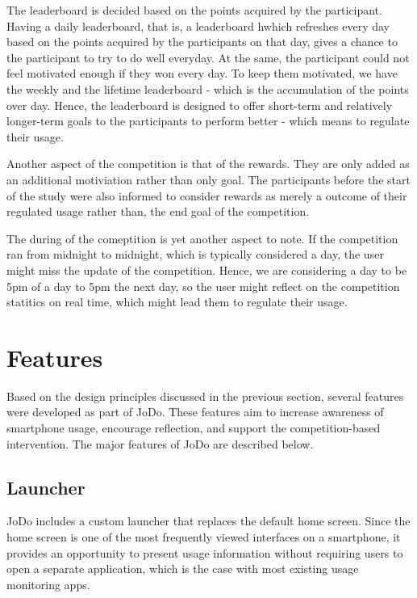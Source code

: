 \documentclass[11pt]{report}
\begin{document}
The leaderboard is decided based on the points acquired by the participant. Having a daily leaderboard, that is, a leaderboard hwhich refreshes every day based on the points acquired by the participants on that day, gives a chance to the participant to try to do well everyday. 
At the same, the participant could not feel motivated enough if they won every day. 
To keep them motivated, we have the weekly and the lifetime leaderboard - which is the accumulation of the points over day. Hence, the leaderboard is designed to offer short-term and relatively longer-term goals to the participants to perform better - which means to regulate their usage.

Another aspect of the competition is that of the rewards. They are only added as an additional motiviation rather than only goal. The participants before the start of the study were also informed to consider rewards as merely a outcome of their regulated usage rather than, the end goal of the competition.

The during of the comeptition is yet another aspect to note. 
If the competition ran from midnight to midnight, which is typically considered a day, 
the user might miss the update of the competition. Hence, we are considering a day to be 
5pm of a day to 5pm the next day, so the user might reflect on the competition statitics 
on real time, which might lead them to regulate their usage.

\section{Features}

Based on the design principles discussed in the previous section, several features were 
developed as part of JoDo. These features aim to increase awareness of smartphone usage, 
encourage reflection, and support the competition-based intervention. The major 
features of JoDo are described below.

\subsection{Launcher}

JoDo includes a custom launcher that replaces the default home screen. Since the home 
screen is one of the most frequently viewed interfaces on a smartphone, it provides an 
opportunity to present usage information without requiring users to open a separate 
application, which is the case with most existing usage monitoring apps.
\end{document}
